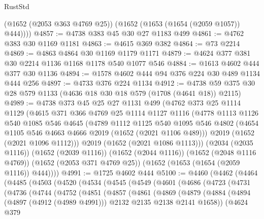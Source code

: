 \begin{lexlean}{RustStd}
\begin{coremodule}
{\begin{coremodule}
{{{{{{{{{{{        (@1652 (@2053 @363 @4769 @25))
        (@1652 (@1653 (@1654 (@2059 @1057)) @444))))
@4857 := @4738 @383 @45 @30 @27 @1183 @499
@4861 := @4762 @383 @30 @1169 @1181
@4863 := @4615 @369 @382
@4864 := @73 @2214
@4869 := @4863 @4864 @30 @1169 @1179 @1171
@4879 := @4624 @377 @381 @30 @2214 @1136 @1168 @1178 @540 @1077 @546
@4884 := @1613 @4602 @444 @377 @30 @1136
@4894 := @1578 @4602 @444 @94 @376 @224 @30 @489 @1134 @444 @256
@4897 := @4733 @376 @224 @1134
@4912 := @4738 @59 @375 @30 @28 @579 @1133 (@4636 @18 @30 @18 @579 (@1708 (@4641 @18)) @2115)
@4989 := @4738
    @373
    @45
    @25
    @27
    @1131
    @499
    (@4762
      @373
      @25
      @1114
      @1129
      (@4615
        @371
        @366
        @4769
        @25
        @1114
        @1127
        @1116
        (@4778
          @1113
          @1126
          @540
          @1085
          @546
          @4645
          (@4789
            @1112
            @1125
            @540
            @1095
            @546
            @4802
            (@4654 @1105 @546 @4663 @4666 @2019 (@1652 (@2021 @1106 @489)))
            @2019
            (@1652 (@2021 @1096 @1112)))
          @2019
          (@1652 (@2021 @1086 @1113)))
        (@2034 (@2035 @1116))
        (@1652 (@2039 @1116))
        (@1652 (@2044 @1116))
        (@1652 (@2048 @1116 @4769))
        (@1652 (@2053 @371 @4769 @25))
        (@1652 (@1653 (@1654 (@2059 @1116)) @444))))
@4991 := @1725 @4602 @444
@5100 := @4460
    (@4462
      (@4464
        (@4485
          (@4503
            (@4520
              (@4534
                (@4545
                  (@4549
                    (@4601
                      (@4686
                        (@4723
                          (@4731
                            (@4736
                              (@4744
                                (@4752
                                  (@4851
                                    (@4857
                                      (@4861
                                        (@4869
                                          (@4879
                                            (@4884
                                              (@4894
                                                (@4897 (@4912 (@4989 @4991)))
                                                @2132
                                                @2135
                                                @2138
                                                @2141
                                                @1658))
                                            (@4624
                                              @379
}}}}}}}}}}}
\end{coremodule}}
\end{coremodule}
\end{lexlean}
